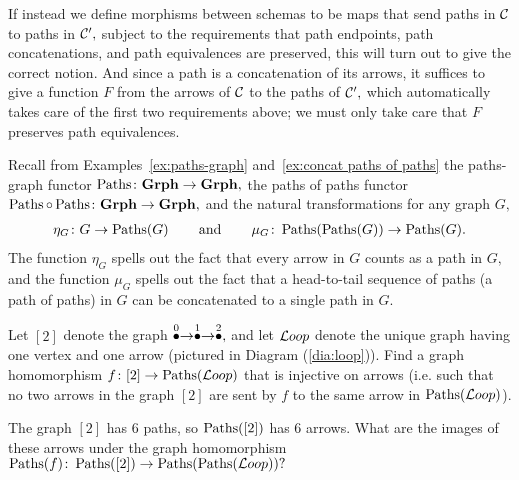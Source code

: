 \documentclass[../main/CT4S-EN-RU]{subfiles}
\begin{document}
\begin{blockRUS}
\end{blockRUS}

\begin{blockENG}
If instead we define morphisms between schemas to be maps that send paths in $\mathcal{C}$ to paths in $\mathcal{C}',$ subject to the requirements that path endpoints, path concatenations, and path equivalences are preserved, this will turn out to give the correct notion. And since a path is a concatenation of its arrows, it suffices to give a function $F$ from the arrows of $\mathcal{C}$ to the paths of $\mathcal{C}',$ which automatically takes care of the first two requirements above; we must only take care that $F$ preserves path equivalences.
\end{blockENG}

\begin{blockRUS}
\end{blockRUS}

\begin{blockENG}
Recall from Examples~\ref{ex:paths-graph} and~\ref{ex:concat paths of paths} the paths-graph functor $\operatorname{Paths}\colon{\mathbf{Grph}}\rightarrow{\mathbf{Grph}},$ the paths of paths functor $\operatorname{Paths}\circ\operatorname{Paths}\colon{\mathbf{Grph}}\rightarrow{\mathbf{Grph}},$ and the natural transformations for any graph $G,$ 
\begin{align}\label{dia:proto paths monad}
\eta_G\colon G\rightarrow\operatorname{Paths}(G)\hspace{.3in}\textnormal{and}\hspace{.3in}\mu_G\colon\operatorname{Paths}(\operatorname{Paths}(G))\rightarrow\operatorname{Paths}(G).
\end{align}
The function $\eta_G$ spells out the fact that every arrow in $G$ counts as a path in $G,$ and the function $\mu_G$ spells out the fact that a head-to-tail sequence of paths (a path of paths) in $G$ can be concatenated to a single path in $G.$
\end{blockENG}

\begin{blockRUS}
\end{blockRUS}

\begin{exerciseENG}
Let $[2]$ denote the graph $\stackrel{0}{\bullet}\rightarrow\stackrel{1}{\bullet}\rightarrow\stackrel{2}{\bullet},$ and let ${\mathcal{L} oop}$ denote the unique graph having one vertex and one arrow (pictured in Diagram (\ref{dia:loop})).
\sexc Find a graph homomorphism $f\colon[2]\rightarrow\operatorname{Paths}({\mathcal{L} oop})$ that is injective on arrows (i.e. such that no two arrows in the graph $[2]$ are sent by $f$ to the same arrow in $\operatorname{Paths}({\mathcal{L} oop})$).
\item The graph $[2]$ has 6 paths, so $\operatorname{Paths}([2])$ has 6 arrows. What are the images of these arrows under the graph homomorphism $\operatorname{Paths}(f)\colon\operatorname{Paths}([2])\rightarrow\operatorname{Paths}(\operatorname{Paths}({\mathcal{L} oop}))?$ 
\endsexc
\end{exerciseENG}
\end{document}
